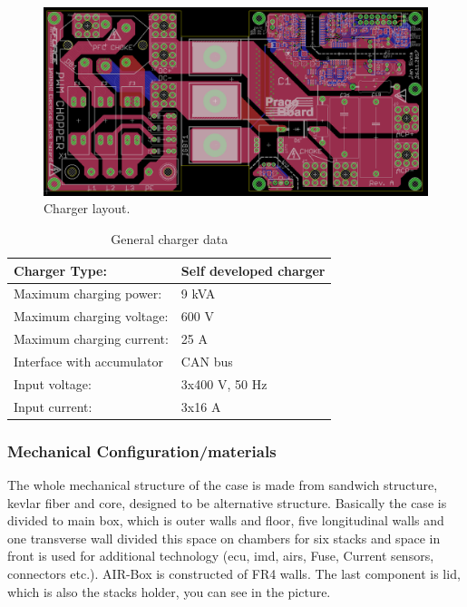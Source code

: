 \begin{figure}[H]
	\centering
	\includegraphics[width=\textwidth]{./img/charger_layout.png}
	\caption{Charger layout.}
	\label{fig:charger_layout}
\end{figure}

\begin{table}[H]
	\centering
	\caption{General charger data}
	\begin{tabu}{|X|X|}
		\hline
		Charger Type: & Self developed charger \\
		\hline
		Maximum charging power: & 9 kVA  \\
		\hline
		Maximum charging voltage: & 600 V \\
		\hline
		Maximum charging current: & 25 A \\
		\hline
		Interface with accumulator & CAN bus \\
		\hline
		Input voltage: & 3x400 V, 50 Hz \\
		\hline
		Input current: & 3x16 A \\
		\hline
	\end{tabu}%
	\label{tab:acc-charger}%
\end{table}%

\subsubsection{Mechanical Configuration/materials}

The whole mechanical structure of the case is made from sandwich structure, kevlar fiber and core, designed to be alternative structure. Basically the case is divided to main box, which is outer walls and floor, five longitudinal walls and one transverse wall divided this space on chambers for six stacks and space in front is used for additional technology (\gls{ecu}, \gls{imd}, \glspl{air}, Fuse, Current sensors, connectors etc.). AIR-Box is constructed of FR4 walls. The last component is lid, which is also the stacks holder, you can see in the picture.

